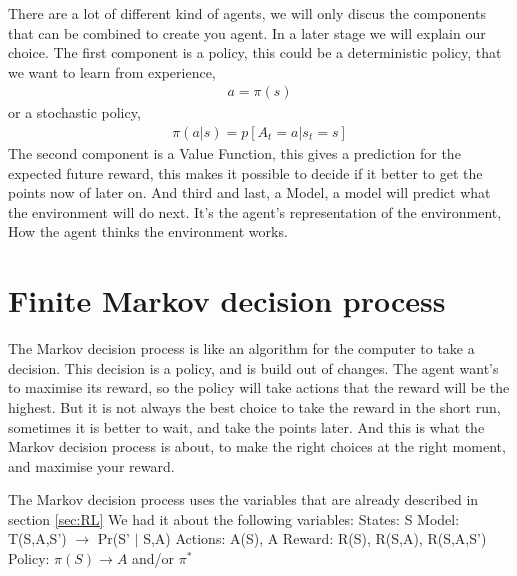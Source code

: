 \documentclass{report}
\begin{document}
There are a lot of different kind of agents, we will only discus the components that can be combined to create you agent. In a later stage we will explain our choice. The first component is a policy, this could be a deterministic policy, that we want to learn from experience,
\begin{align}
    a=\pi(s)    
\end{align}
or a stochastic policy,
\begin{align}
    \pi(a|s)=p[A_t=a|s_t=s]
\end{align}
The second component is a Value Function, this gives a prediction for the expected future reward, this makes it possible to decide if it better to get the points now of later on.
And third and last, a Model, a model will predict what the environment will do next. It’s the agent’s representation of the environment, How the agent thinks the environment works.

\section{Finite Markov decision process \label{sec:MDP}}
The Markov decision process is like an algorithm for the computer to take a decision. This decision is a policy, and is build out of changes. The agent want's to maximise its reward, so the policy will take actions that the reward will be the highest. But it is not always the best choice to take the reward in the short run, sometimes it is better to wait, and take the points later. And this is what the Markov decision process is about, to make the right choices at the right moment, and maximise your reward.

The Markov decision process uses the variables that are already described in section \ref{sec:RL} We had it about the following variables:\newline
States: S\newline
Model: T(S,A,S') $\rightarrow$ Pr(S' $\mid$ S,A)\newline
Actions: A(S), A\newline
Reward: R(S), R(S,A), R(S,A,S')\newline
Policy: $\pi(S) \rightarrow A$ and/or $\pi^*$\newline
\end{document}
